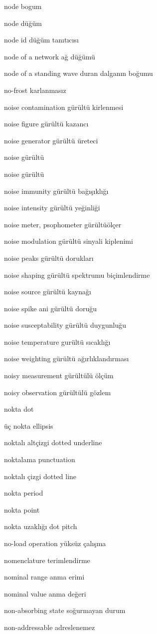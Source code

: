 \documentclass[12pt,fleqn]{article}\usepackage{../../common}
\begin{document}
node bogum

node düğüm

node id düğüm tanıtıcısı

node of a network ağ düğümü

node of a standing wave duran dalganın boğumu

no-frost karlanmasız

noise contamination gürültü kirlenmesi

noise figure gürültü kazancı

noise generator gürültü üreteci

noise gürültü

noise gürültü

noise immunity gürültü bağışıklığı

noise intensity gürültü yeğinliği

noise meter, psophometer gürültüölçer

noise modulation gürültü sinyali kiplenimi

noise peaks gürültü dorukları

noise shaping gürültü spektrumu biçimlendirme

noise source gürültü kaynağı

noise spike ani gürültü doruğu

noise susceptability gürültü duygunluğu

noise temperature gurültü sıcaklığı

noise weighting gürültü ağırlıklandırması

noisy measurement gürültülü ölçüm

noisy observation gürültülü gözlem

nokta dot

üç nokta ellipsis

noktalı altçizgi dotted underline

noktalama punctuation

noktalı çizgi dotted line

nokta period

nokta point

nokta uzaklığı dot pitch

no-load operation yüksüz çalışma

nomenclature terimlendirme

nominal range anma erimi

nominal value anma değeri

non-absorbing state soğurmayan durum

non-addressable adreslenemez
\end{document}
